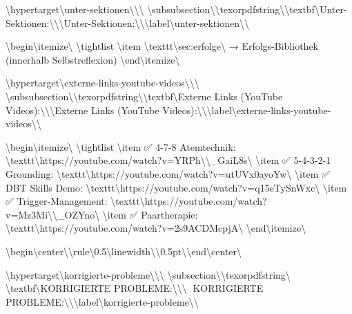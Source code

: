 \textbackslash{}hypertarget\textbackslash{}{unter-sektionen\textbackslash{}}\textbackslash{}{\textbackslash{}%
\textbackslash{}subsubsection\textbackslash{}{\textbackslash{}texorpdfstring\textbackslash{}{\textbackslash{}textbf\textbackslash{}{Unter-Sektionen:\textbackslash{}}\textbackslash{}}\textbackslash{}{Unter-Sektionen:\textbackslash{}}\textbackslash{}}\textbackslash{}label\textbackslash{}{unter-sektionen\textbackslash{}}\textbackslash{}}

\textbackslash{}begin\textbackslash{}{itemize\textbackslash{}}
\textbackslash{}tightlist
\textbackslash{}item
  \textbackslash{}texttt\textbackslash{}{sec:erfolge\textbackslash{}} → Erfolgs-Bibliothek (innerhalb Selbstreflexion)
\textbackslash{}end\textbackslash{}{itemize\textbackslash{}}

\textbackslash{}hypertarget\textbackslash{}{externe-links-youtube-videos\textbackslash{}}\textbackslash{}{\textbackslash{}%
\textbackslash{}subsubsection\textbackslash{}{\textbackslash{}texorpdfstring\textbackslash{}{\textbackslash{}textbf\textbackslash{}{Externe Links (YouTube Videos):\textbackslash{}}\textbackslash{}}\textbackslash{}{Externe Links (YouTube Videos):\textbackslash{}}\textbackslash{}}\textbackslash{}label\textbackslash{}{externe-links-youtube-videos\textbackslash{}}\textbackslash{}}

\textbackslash{}begin\textbackslash{}{itemize\textbackslash{}}
\textbackslash{}tightlist
\textbackslash{}item
  ✅ 4-7-8 Atemtechnik: \textbackslash{}texttt\textbackslash{}{https://youtube.com/watch?v=YRPh\textbackslash{}\textbackslash{}_GaiL8s\textbackslash{}}
\textbackslash{}item
  ✅ 5-4-3-2-1 Grounding: \textbackslash{}texttt\textbackslash{}{https://youtube.com/watch?v=utUVx0ayoYw\textbackslash{}}
\textbackslash{}item
  ✅ DBT Skills Demo: \textbackslash{}texttt\textbackslash{}{https://youtube.com/watch?v=q15eTySnWxc\textbackslash{}}
\textbackslash{}item
  ✅ Trigger-Management: \textbackslash{}texttt\textbackslash{}{https://youtube.com/watch?v=Mz3Mi\textbackslash{}\textbackslash{}_OZYno\textbackslash{}}
\textbackslash{}item
  ✅ Paartherapie: \textbackslash{}texttt\textbackslash{}{https://youtube.com/watch?v=2s9ACDMcpjA\textbackslash{}}
\textbackslash{}end\textbackslash{}{itemize\textbackslash{}}

\textbackslash{}begin\textbackslash{}{center\textbackslash{}}\textbackslash{}rule\textbackslash{}{0.5\textbackslash{}linewidth\textbackslash{}}\textbackslash{}{0.5pt\textbackslash{}}\textbackslash{}end\textbackslash{}{center\textbackslash{}}

\textbackslash{}hypertarget\textbackslash{}{korrigierte-probleme\textbackslash{}}\textbackslash{}{\textbackslash{}%
\textbackslash{}subsection\textbackslash{}{\textbackslash{}texorpdfstring\textbackslash{}{🔧 \textbackslash{}textbf\textbackslash{}{KORRIGIERTE PROBLEME:\textbackslash{}}\textbackslash{}}\textbackslash{}{🔧 KORRIGIERTE PROBLEME:\textbackslash{}}\textbackslash{}}\textbackslash{}label\textbackslash{}{korrigierte-probleme\textbackslash{}}\textbackslash{}}

